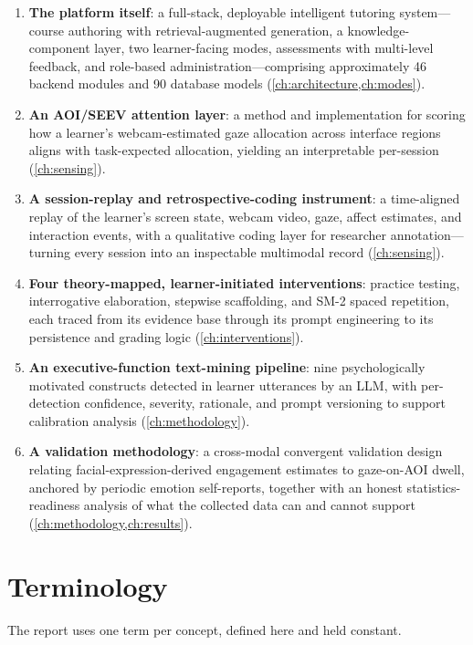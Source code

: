 \begin{enumerate}
  \item \textbf{The platform itself}: a full-stack, deployable intelligent
  tutoring system---course authoring with retrieval-augmented generation,
  a knowledge-component layer, two learner-facing modes, assessments with
  multi-level feedback, and role-based administration---comprising
  approximately 46 backend modules and 90 database models
  (\cref{ch:architecture,ch:modes}).
  \item \textbf{An AOI/SEEV attention layer}: a method and implementation
  for scoring how a learner's webcam-estimated gaze allocation across
  interface regions aligns with task-expected allocation, yielding an
  interpretable per-session \allocscore{} (\cref{ch:sensing}).
  \item \textbf{A session-replay and retrospective-coding instrument}: a
  time-aligned replay of the learner's screen state, webcam video, gaze,
  affect estimates, and interaction events, with a qualitative coding
  layer for researcher annotation---turning every session into an
  inspectable multimodal record (\cref{ch:sensing}).
  \item \textbf{Four theory-mapped, learner-initiated interventions}:
  practice testing, interrogative elaboration, stepwise scaffolding, and
  SM-2 spaced repetition, each traced from its evidence base through its
  prompt engineering to its persistence and grading logic
  (\cref{ch:interventions}).
  \item \textbf{An executive-function text-mining pipeline}: nine
  psychologically motivated constructs detected in learner utterances by
  an LLM, with per-detection confidence, severity, rationale, and prompt
  versioning to support calibration analysis (\cref{ch:methodology}).
  \item \textbf{A validation methodology}: a cross-modal convergent
  validation design relating facial-expression-derived engagement
  estimates to gaze-on-AOI dwell, anchored by periodic emotion
  self-reports, together with an honest statistics-readiness analysis of
  what the collected data can and cannot support
  (\cref{ch:methodology,ch:results}).
\end{enumerate}

\section{Terminology}
\label{sec:intro-terminology}

The report uses one term per concept, defined here and held constant.


